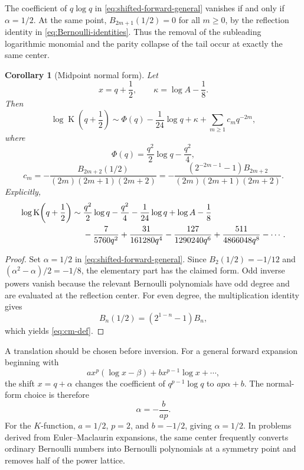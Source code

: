 \documentclass[11pt,oneside]{article}
\theoremstyle{plain}
\newtheorem{corollary}[theorem]{Corollary}
\theoremstyle{definition}
\theoremstyle{remark}
\newcommand{\Kfun}{\operatorname{K}}
\begin{document}
The coefficient of \(q\log q\) in \eqref{eq:shifted-forward-general} vanishes
if and only if \(\alpha=1/2\).  At the same point,
\(B_{2m+1}(1/2)=0\) for all \(m\ge0\), by the reflection identity in
\eqref{eq:Bernoulli-identities}.  Thus the removal of the subleading logarithmic
monomial and the parity collapse of the tail occur at exactly the same center.

\begin{corollary}[Midpoint normal form]
\label{cor:midpoint-normal-form}
Let
\begin{equation}
 x=q+\frac12,
 \qquad
 \kappa=\log A-\frac18.
 \label{eq:q-kappa-def}
\end{equation}
Then
\begin{equation}
 \boxed{
 \log\Kfun\!\left(q+\frac12\right)
 \sim \Phi(q)-\frac1{24}\log q+\kappa
       +\sum_{m\ge1}c_mq^{-2m},}
 \label{eq:centered-forward}
\end{equation}
where
\begin{equation}
 \Phi(q)=\frac{q^2}{2}\log q-\frac{q^2}{4},
 \label{eq:Phi-def}
\end{equation}
\begin{equation}
 c_m=-\frac{B_{2m+2}(1/2)}{(2m)(2m+1)(2m+2)}
 =-\frac{(2^{-2m-1}-1)B_{2m+2}}
          {(2m)(2m+1)(2m+2)}.
 \label{eq:cm-def}
\end{equation}
Explicitly,
\begin{align}
 \log\Kfun\!\left(q+\frac12\right)
 \sim{}&\frac{q^2}{2}\log q-\frac{q^2}{4}
 -\frac1{24}\log q+\log A-\frac18
 \notag\\
 &-\frac{7}{5760q^2}
 +\frac{31}{161280q^4}
 -\frac{127}{1290240q^6}
 +\frac{511}{4866048q^8}
 -\cdots.
 \label{eq:centered-first}
\end{align}
\end{corollary}

\begin{proof}
Set \(\alpha=1/2\) in \eqref{eq:shifted-forward-general}.  Since
\(B_2(1/2)=-1/12\) and \((\alpha^2-\alpha)/2=-1/8\), the elementary part has
the claimed form.  Odd inverse powers vanish because the relevant Bernoulli
polynomials have odd degree and are evaluated at the reflection center.
For even degree, the multiplication identity gives
\[
 B_n(1/2)=(2^{1-n}-1)B_n,
\]
which yields \eqref{eq:cm-def}.
\end{proof}

\begin{methodbox}
A translation should be chosen before inversion.  For a general forward
expansion beginning with
\[
 a x^p(\log x-\beta)+b x^{p-1}\log x+\cdots,
\]
the shift \(x=q+\alpha\) changes the coefficient of
\(q^{p-1}\log q\) to \(ap\alpha+b\).  The normal-form choice is therefore
\[
 \alpha=-\frac{b}{ap}.
\]
For the \(K\)-function, \(a=1/2\), \(p=2\), and \(b=-1/2\), giving
\(\alpha=1/2\).  In problems derived from Euler--Maclaurin expansions, the same
center frequently converts ordinary Bernoulli numbers into Bernoulli
polynomials at a symmetry point and removes half of the power lattice.
\end{methodbox}
\end{document}
